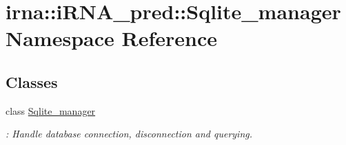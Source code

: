 \hypertarget{namespaceirna_1_1iRNA__pred_1_1Sqlite__manager}{
\section{irna\-:\-:i\-R\-N\-A\-\_\-pred\-:\-:\-Sqlite\-\_\-manager \-Namespace \-Reference}
\label{namespaceirna_1_1iRNA__pred_1_1Sqlite__manager}
}
\subsection*{\-Classes}
\begin{DoxyCompactItemize}
\item 
class \hyperlink{classirna_1_1iRNA__pred_1_1Sqlite__manager_1_1Sqlite__manager}{\-Sqlite\-\_\-manager}
\begin{DoxyCompactList}\small\item\em \-: \-Handle database connection, disconnection and querying. \end{DoxyCompactList}\end{DoxyCompactItemize}
